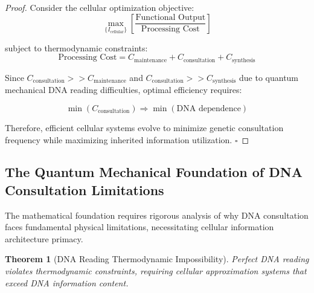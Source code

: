 \documentclass[12pt,a4paper]{article}
\newtheorem{theorem}{Theorem}[section]
\begin{document}
\begin{proof}
Consider the cellular optimization objective:
$$\max_{\{I_{\text{cellular}}\}} \left[\frac{\text{Functional Output}}{\text{Processing Cost}}\right]$$

subject to thermodynamic constraints:
$$\text{Processing Cost} = C_{\text{maintenance}} + C_{\text{consultation}} + C_{\text{synthesis}}$$

Since $C_{\text{consultation}} >> C_{\text{maintenance}}$ and $C_{\text{consultation}} >> C_{\text{synthesis}}$ due to quantum mechanical DNA reading difficulties, optimal efficiency requires:

$$\min(C_{\text{consultation}}) \Rightarrow \min(\text{DNA dependence})$$

Therefore, efficient cellular systems evolve to minimize genetic consultation frequency while maximizing inherited information utilization. $\square$
\end{proof}

\subsection{The Quantum Mechanical Foundation of DNA Consultation Limitations}

The mathematical foundation requires rigorous analysis of why DNA consultation faces fundamental physical limitations, necessitating cellular information architecture primacy.

\begin{theorem}[DNA Reading Thermodynamic Impossibility]
Perfect DNA reading violates thermodynamic constraints, requiring cellular approximation systems that exceed DNA information content.
\end{theorem}
\end{document}
